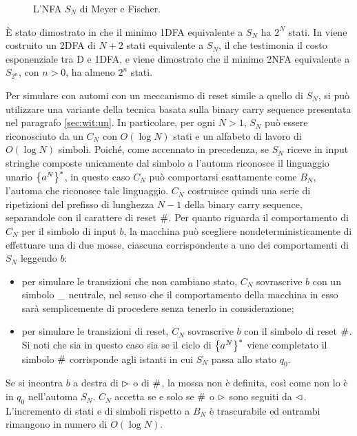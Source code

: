 \begin{figure}
	\centering
	
	\caption{L'NFA $S_N$ di Meyer e Fischer.}
	\label{img:wit:Sn}
\end{figure}

È stato dimostrato in \cite{Meyer:71:ecodescription} che il minimo 1DFA equivalente a $S_N$ ha $2^N$ stati. In \cite{Pighizzini:22:limitedwitness} viene costruito un 2DFA di $N+2$ stati equivalente a $S_N$, il che testimonia il costo esponenziale tra D e 1DFA, e viene dimostrato che il minimo 2NFA equivalente a $S_{2^n}$, con $n>0$, ha almeno $2^n$ stati.

Per simulare con  automi con un meccanismo di reset simile a quello di $S_N$, si può utilizzare una variante della tecnica basata sulla binary carry sequence presentata nel paragrafo \ref{sec:wit:un}. In particolare, per ogni $N>1$, $S_N$ può essere riconosciuto da un  $C_N$ con $O(\log N)$ stati e un alfabeto di lavoro di $O(\log N)$ simboli.
Poiché, come accennato in precedenza, se $S_N$ riceve in input stringhe composte unicamente dal simbolo $a$ l'automa riconosce il linguaggio unario $\left\{ a^N \right\}^*$, in questo caso $C_N$ può comportarsi esattamente come $B_N$, l'automa che riconosce tale linguaggio. $C_N$ costruisce quindi una serie di ripetizioni del prefisso di lunghezza $N-1$ della binary carry sequence, separandole con il carattere di reset $\#$. Per quanto riguarda il comportamento di $C_N$ per il simbolo di input $b$, la macchina può scegliere nondeterministicamente di effettuare una di due mosse, ciascuna corrispondente a uno dei comportamenti di $S_N$ leggendo $b$:
\begin{itemize}
	\item per simulare le transizioni che non cambiano stato, $C_N$ sovrascrive $b$ con un simbolo $\_$ neutrale, nel senso che il comportamento della macchina in esso sarà semplicemente di procedere senza tenerlo in considerazione;
	\item per simulare le transizioni di reset, $C_N$ sovrascrive $b$ con il simbolo di reset $\#$. Si noti che sia in questo caso sia se il ciclo di $\left\{ a^N \right\}^*$ viene completato il simbolo $\#$ corrisponde agli istanti in cui $S_N$ passa allo stato $q_0$.
\end{itemize}
Se si incontra $b$ a destra di $\rhd$ o di $\#$, la mossa non è definita, così come non lo è in $q_0$ nell'automa $S_N$. $C_N$ accetta se e solo se $\#$ o $\rhd$ sono seguiti da $\lhd$. L'incremento di stati e di simboli rispetto a $B_N$ è trascurabile ed entrambi rimangono in numero di $O(\log N)$.

